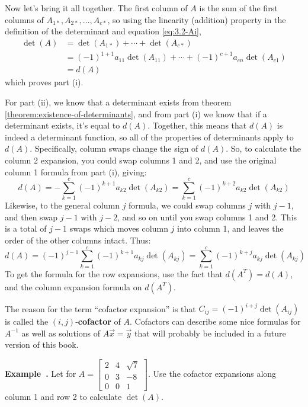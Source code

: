 \documentclass[11pt, letterpaper]{report}
\newenvironment{notes}{}{}
\newenvironment{book}{}{}
\newcounter{example}[section]
\newcommand{\example}{\refstepcounter{example}%
\par\noindent\textbf{Example~\theexample.} }
\newcounter{theorem}[chapter]
\begin{document}
\begin{book}
Now let's bring it all together. The first column of $A$ is the sum of the first columns of $A_{1*}, A_{2*}, \ldots, A_{c*}$, so using the linearity (addition) property in the definition of the determinant and equation \ref{eq:3.2-Ai},
\begin{align*}
\det(A) &= \det(A_{1*})  + \cdots + \det(A_{c*}) \\
&= (-1)^{1+1}a_{11}\det(A_{11})  + \cdots + (-1)^{c+1}a_{cn}\det(A_{c1}) \\
&= d(A)
\end{align*}
which proves part (i).

For part (ii), we know that a determinant exists from theorem \ref{theorem:existence-of-determinants}, and from part (i) we know that if a determinant exists, it's equal to $d(A)$. Together, this means that $d(A)$ is indeed a determinant function, so all of the properties of determinants apply to $d(A)$. Specifically, column swaps change the sign of $d(A)$. So, to calculate the column 2 expansion, you could swap columns 1 and 2, and use the original column 1 formula from part (i), giving:
\[ d(A) = -\sum_{k=1}^c(-1)^{k+1}a_{k2}\det(A_{k2}) = \sum_{k=1}^c(-1)^{k+2}a_{k2}\det(A_{k2}) \]
Likewise, to the general column $j$ formula, we could swap columns $j$ with $j-1$, and then swap $j-1$ with $j-2$, and so on until you swap columns 1 and 2. This is a total of $j-1$ swaps which moves column $j$ into column 1, and leaves the order of the other columns intact. Thus:
\[ d(A) = (-1)^{j-1}\sum_{k=1}^c(-1)^{k+1}a_{kj}\det(A_{kj}) = \sum_{k=1}^c(-1)^{k+j}a_{kj}\det(A_{kj}) \]
To get the formula for the row expansions, use the fact that $d(A^T)=d(A)$, and the column expansion formula on $d(A^T)$. \blacksquare
\end{book}

The reason for the term ``cofactor expansion'' is that $C_{ij} = (-1)^{i+j}\det(A_{ij})$ is called the $(i,j)$-\textbf{cofactor} of $A$. Cofactors can describe some nice formulas for $A^{-1}$ as well as solutions of $A\vec{x}=\vec{y}$ that will probably be included in a future version of this book.

\example Let  for $A=\begin{bmatrix}
2 & 4 & \sqrt{7} \\
0 & 3 & -8 \\
0 & 0 & 1
\end{bmatrix}$. Use the cofactor expansions along column 1 and row 2 to calculate $\det(A)$.

\begin{notes}
\newpage
\end{notes}
\end{document}
